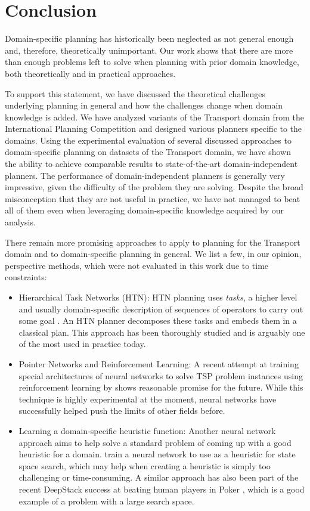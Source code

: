 \chapter*{Conclusion}

Domain-specific planning has historically been neglected as not general enough
and, therefore, theoretically unimportant.
Our work shows that there are more than enough problems
left to solve when planning with prior domain knowledge,
both theoretically and in practical approaches.

To support this statement,
we have discussed the theoretical challenges underlying
planning in general and how the challenges change when
domain knowledge is added.
We have analyzed variants of the Transport domain from the International Planning Competition
and designed various planners specific to the domains.
Using the experimental evaluation of several discussed approaches to
domain-specific planning on datasets of the Transport domain, we have shown the ability to achieve comparable results to state-of-the-art domain-independent planners.
The performance of domain-independent planners is generally very impressive, given the difficulty of the problem they are solving. Despite the broad misconception that they are not useful in practice,
we have not managed to beat all of them even when leveraging domain-specific knowledge acquired by our analysis.

There remain more promising approaches to apply to planning
for the Transport domain
and to domain-specific planning in general.
We list a few, in our opinion, perspective methods, which were not
evaluated in this work due to time constraints:
\begin{itemize}
\item Hierarchical Task Networks (HTN): 
HTN planning uses \textit{tasks},
a higher level and usually domain-specific description of sequences of operators
to carry out some goal \citep[Chapter~11]{Ghallab2004}.
An HTN planner decomposes these tasks and embeds them in a classical plan. This approach has been thoroughly studied and is arguably one of the most used in practice today.

\item Pointer Networks and Reinforcement Learning: 
A recent attempt at training special architectures of neural networks to solve TSP problem instances using reinforcement learning by \citet{Bello2016} shows
reasonable promise for the future. While this technique is highly experimental at the moment,
neural networks have successfully helped push the limits of other fields before.

\item Learning a domain-specific heuristic function: Another neural network
approach aims to help solve a standard problem of coming up with a good heuristic for a domain. \citet{Chen2011}
train a neural network to use as a heuristic for state space search,
which may help when creating a heuristic is simply too challenging or time-consuming.
A similar approach has also been part of the recent DeepStack success at
beating human players in Poker \citep{Moravcik2017}, which is a good example of a problem with a large search space.
\end{itemize}

